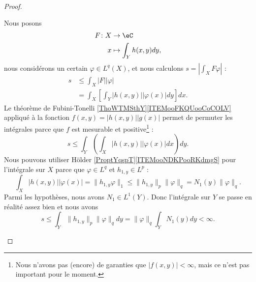 \begin{proof}
\begin{subproof}
\begin{subproof}
			Nous posons
			\begin{equation}
				\begin{aligned}
					F\colon X & \to \eC                 \\
					x         & \mapsto \int_Yh(x,y)dy,
				\end{aligned}
			\end{equation}
			nous considérons un certain \( \varphi\in L^q(X)\), et nous calculons \( s = | \int_XF\varphi |\) :
			\begin{subequations}
				\begin{align}
					s & \leq \int_X| F || \varphi |                                 \\
					  & =\int_X\left[  \int_Y| h(x,y) || \varphi(x) |dy  \right]dx.
				\end{align}
			\end{subequations}
			Le théorème de Fubini-Tonelli \ref{ThoWTMSthY}\ref{ITEMooFKQUooCoCOLV} appliqué à la fonction \( f(x,y)=| h(x,y) || g(x) |\) permet de permuter les intégrales parce que \( f\) est mesurable et positive\footnote{Nous n'avons pas (encore) de garanties que \( | f(x,y) |<\infty\), mais ce n'est pas important pour le moment.} :
			\begin{equation}
				s \leq \int_Y\left( \int_X| h(x,y) || \varphi(x) |dx \right)dy.
			\end{equation}
			Nous pouvons utiliser Hölder \ref{ProptYqspT}\ref{ITEMooNDKPooRKdmgS} pour l'intégrale sur \( X\) parce que \( \varphi\in L^q\) et \( h_{1,y}\in L^p\) :
			\begin{equation}
				\int_X| h(x,y) || \varphi(x) |=\| h_{1,y}\varphi \|_1\leq \| h_{1,y} \|_p\| \varphi \|_q = N_1(y)\| \varphi \|_q.
			\end{equation}
			Parmi les hypothèses, nous avons \( N_1\in L^1(Y)\). Donc l'intégrale sur \( Y\) se passe en réalité assez bien et nous avons
			\begin{equation}
				s\leq \int_Y\| h_{1,y} \|_p\| \varphi \|_qdy=\| \varphi \|_q\int_YN_1(y)dy<\infty.
			\end{equation}


\end{subproof}
\end{subproof}
\end{proof}
